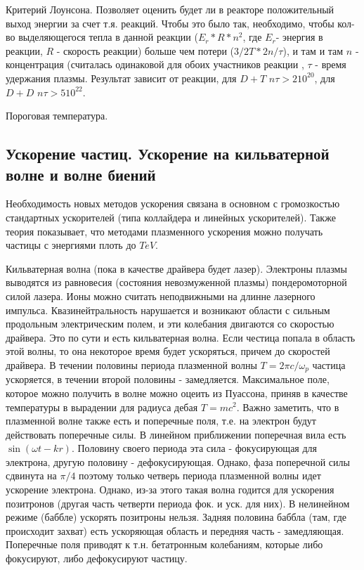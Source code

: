 \documentclass[10pt, a4paper]{article}
\begin{document}
Критерий Лоунсона.
Позволяет оценить будет ли в реакторе положительный выход энергии за счет т.я. реакций. Чтобы это было так, необходимо,
чтобы кол-во выделяющегося тепла в данной реакции ($E_{r}*R*n^2$, где $E_r$- энергия в реакции, $R$ - скорость реакции) 
больше чем потери ($3/2 T * 2n / \tau$), и там и там $n$ - концентрация (считалась одинаковой для обоих участников реакции
, $\tau$ - время удержания плазмы. Результат зависит от реакции, для $D+T$ $n\tau > 2 10^{20}$, для $D+D$ $n\tau>5 10^{22}$.

Пороговая температура.




\subsection{Ускорение частиц. Ускорение на кильватерной волне и волне биений}
Необходимость новых методов ускорения связана в основном с громозкостью стандартных ускорителей (типа коллайдера и 
линейных ускорителей). Также теория показывает, что методами плазменного ускорения можно получать частицы с энергиями
плоть до $TeV$.

Кильватерная волна (пока в качестве драйвера будет лазер).
Электроны плазмы выводятся из равновесия (состояния невозмуженной плазмы) пондеромоторной силой лазера. Ионы можно считать
неподвижными на длинне лазерного импульса. Квазинейтральность нарушается и возникают области с сильным продольным 
электрическим полем, и эти колебания двигаются со скоростью драйвера. Это по сути и есть кильватерная волна. Если
честица попала в область этой волны, то она некоторое время будет ускоряться, причем до скоростей драйвера. 
В течении половины периода плазменной волны $T=2\pi c/\omega_p$ частица ускоряется, в течении второй половины - замедляется.
Максимальное поле, которое можно получить в волне можно оцеить из Пуассона, приняв в качестве температуры в вырадении для
радиуса дебая $T=mc^2$. Важно заметить, что в плазменной волне также есть и поперечные поля, т.е. на электрон будут
действовать поперечные силы. В линейном приближении поперечная вила есть $\sin(\omega t - kr)$. Половину своего периода 
эта сила - фокусирующая для электрона, другую половину - дефокусирующая. Однако, фаза поперечной силы сдвинута на $\pi/4$
поэтому только четверь периода плазменной волны идет ускорение электрона. 
Однако, из-за этого такая волна годится для ускорения позитронов (другая часть четверти периода фок. и уск. для них). В
нелинейном режиме (баббле) ускорять позитроны нельзя. Задняя половина баббла (там, где происходит захват) есть
ускоряющая область и передняя часть - замедляющая. Поперечные поля приводят к т.н. бетатронным колебаниям, которые либо 
фокусируют, либо дефокусируют частицу.
\end{document}

